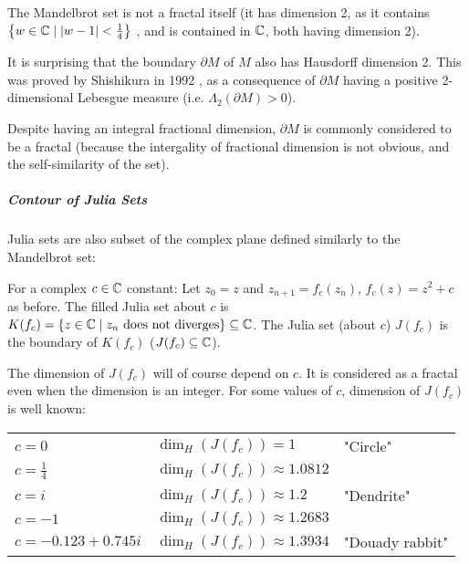 The Mandelbrot set is not a fractal itself (it has dimension 2, as it contains $\left\lbrace w \in \mathbb{C} \mid | w-1 | < \frac{1}{4} \right\rbrace$ \cite{3DXplorMath}, and is contained in $\mathbb{C}$, both having dimension 2).

It is surprising that the boundary $\partial M$ of $M$ also has Hausdorff dimension 2.
This was proved by Shishikura in 1992 \cite{Shishikura_1992}, as a consequence of $\partial M$ having a positive 2-dimensional Lebesgue measure (i.e. $\Lambda_2(\partial M) > 0$).

Despite having an integral fractional dimension, $\partial M$ is commonly considered to be a fractal (because the intergality of fractional dimension is not obvious, and the self-similarity of the set).

\subparagraph{Contour of Julia Sets}
Julia sets are also subset of the complex plane defined similarly to the Mandelbrot set:
\begin{definition}\label{def:JuliaSet}
	For a complex $c \in \mathbb{C}$ constant:
	Let $z_0 = z$ and $z_{n+1} = f_c(z_n)$, $f_c(z) = z^2+c$ as before.
	The filled Julia set about $c$ is $K(f_c) = \left\lbrace z \in \mathbb{C} \mid z_n \text{ does not diverges} \right\rbrace \subseteq \mathbb{C} $.
	The Julia set (about $c$) $J(f_c)$ is the boundary of $K(f_c)$ ($J(f_c) \subseteq \mathbb{C}$).
\end{definition}

The dimension of $J(f_c)$ will of course depend on $c$.
It is considered as a fractal even when the dimension is an integer.
For some values of $c$, dimension of $J(f_c)$ is well known:

\vspace{0.2cm}
\begin{tabular}{l l l}\label{table:JuliaSetDimensions}
	$c = 0$             & $\dim_H(J(f_c)) = 1$            & "Circle"\\
	$c = \frac{1}{4}$   & $\dim_H(J(f_c)) \approx 1.0812$ & \\
	$c = i$             & $\dim_H(J(f_c)) \approx 1.2$    & "Dendrite" \\
	$c = -1$            & $\dim_H(J(f_c)) \approx 1.2683$ & \\
	$c = -0.123+0.745i$ & $\dim_H(J(f_c)) \approx 1.3934$ & "Douady rabbit" \\
\end{tabular}
\vspace{0.3cm}

